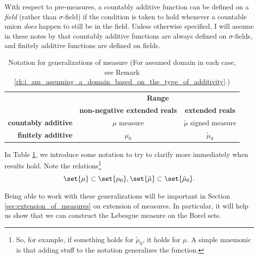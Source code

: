 \documentclass{article} %
\renewcommand{\sf}{$\sigma$-field}
\newcommand{\sfs}{$\sigma$-fields}
\begin{document}
\begin{remark}
With respect to pre-measures, a countably additive function can be defined on a \textit{field} (rather than \sf) if the condition is taken to hold whenever a countable union \textit{does} happen to still be in the field.  Unless otherwise specified, I will assume in these notes by that countably additive functions are always defined on \sfs, and finitely additive functions are defined on fields.
\label{rk:i_am_assuming_a_domain_based_on_the_type_of_additivity}
\end{remark}	



\begin{table}[!h]
\centering	
\begin{tabular}{rcc}
&\multicolumn{2}{c}{\textbf{Range}} \\
& \textbf{non-negative extended reals} & \textbf{extended reals} \\
\textbf{countably additive}& $\mu$ measure  & $\tilde{\mu}$ signed measure \\
\textbf{finitely additive}& $\mu_0$ & $\tilde{\mu}_0$ \\	
\end{tabular}
\caption{Notation for generalizations of measure (For assumed domain in each case, see Remark \ref{rk:i_am_assuming_a_domain_based_on_the_type_of_additivity}.)}
\label{tab:notation_for_generalizations_of_measure}
\end{table}

In Table \ref{tab:notation_for_generalizations_of_measure},  we introduce some notation to try to clarify more immediately when results hold. Note the relations\footnote{So, for example, if something holds for $\tilde{\mu}_0$, it holds for $\mu$.  A simple mnemonic is that adding stuff to the notation generalizes the function.}  
\[ \set{\mu} \subset \set{\mu_0}, \set{\tilde{\mu}} \subset \set{\tilde{\mu}_0}. \]

\begin{remark}
Being able to work with these generalizations will be important in Section \ref{sec:extension_of_measures} on extension of measures.  In particular, it will help us show that we can construct the Lebesgue measure on the Borel sets.
\end{remark}
\end{document}
